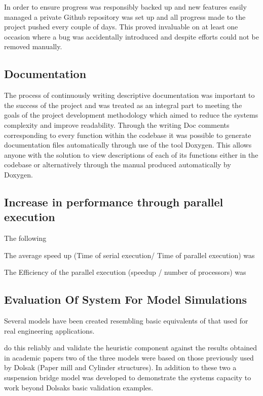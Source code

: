 \noindent
In order to ensure progress was responsibly backed up and new features easily managed a private Github repository was set up and all progress made to the project pushed every couple of days. This proved invaluable on at least one occasion where a bug was accidentally introduced and despite efforts could not be removed manually. 

\subsection{Documentation}
The process of continuously writing descriptive documentation was important to the success of the project and was treated as an integral part to meeting the goals of the project development methodology which aimed to reduce the systems complexity and improve readability. Through the writing Doc comments corresponding to every function within the codebase it was possible to generate documentation files automatically through use of the tool Doxygen. This allows anyone with the solution to view descriptions of each of its functions either in the codebase or alternatively through the manual produced automatically by Doxygen.



\subsection{Increase in performance through parallel execution}
The following 

The average speed up (Time of serial execution/ Time of parallel execution) was 

The Efficiency of the parallel execution (speedup / number of processors) was
 

\subsection{Evaluation Of System For Model Simulations}


Several models have been created resembling basic equivalents of that used for real engineering applications.

do this reliably and validate the heuristic component against the results obtained in academic papers two of the three models were based on those previously used by Dolsak (Paper mill and Cylinder structures). In addition to these two a suspension bridge model was developed to demonstrate the systems capacity to work beyond Dolsaks basic validation examples. \\ 

